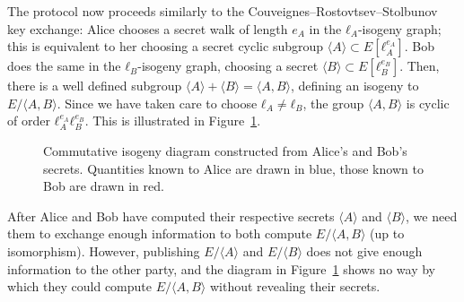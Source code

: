 \documentclass{report}
\theoremstyle{plain}
\theoremstyle{definition}
\begin{document}
The protocol now proceeds similarly to the
Couveignes--Rostovtsev--Stolbunov key exchange: Alice chooses a secret
walk of length $e_A$ in the $ℓ_A$-isogeny graph; this is equivalent to
her choosing a secret cyclic subgroup $〈A〉⊂E[ℓ_A^{e_A}]$. %
Bob does the same in the $ℓ_B$-isogeny graph, choosing a secret
$〈B〉⊂E[ℓ_B^{e_B}]$. %
Then, there is a well defined subgroup $〈A〉+〈B〉=〈A,B〉$, defining
an isogeny to $E/〈A,B〉$. %
Since we have taken care to choose $ℓ_A≠ℓ_B$, the group $〈A,B〉$ is
cyclic of order $ℓ_A^{e_A}ℓ_B^{e_B}$. %
This is illustrated in Figure~\ref{fig:sidh-diag}.

\begin{figure}
  \centering
  \caption{Commutative isogeny diagram constructed from Alice's and
    Bob's secrets. %
    Quantities known to Alice are drawn in blue, those known to Bob
    are drawn in red.}
  \label{fig:sidh-diag}
\end{figure}

After Alice and Bob have computed their respective secrets $〈A〉$ and
$〈B〉$, we need them to exchange enough information to both compute
$E/〈A,B〉$ (up to isomorphism). %
However, publishing $E/〈A〉$ and $E/〈B〉$ does not give enough
information to the other party, and the diagram in
Figure~\ref{fig:sidh-diag} shows no way by which they could compute
$E/〈A,B〉$ without revealing their secrets. %
\end{document}
